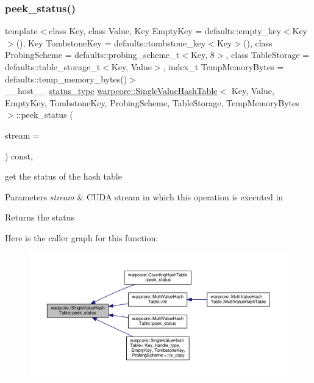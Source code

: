 \subsubsection{\texorpdfstring{peek\+\_\+status()}{peek\_status()}}
{\footnotesize\ttfamily template$<$class Key, class Value, Key Empty\+Key = defaults\+::empty\+\_\+key$<$\+Key$>$(), Key Tombstone\+Key = defaults\+::tombstone\+\_\+key$<$\+Key$>$(), class Probing\+Scheme = defaults\+::probing\+\_\+scheme\+\_\+t$<$\+Key, 8$>$, class Table\+Storage = defaults\+::table\+\_\+storage\+\_\+t$<$\+Key, Value$>$, index\+\_\+t Temp\+Memory\+Bytes = defaults\+::temp\+\_\+memory\+\_\+bytes()$>$ \\
\+\_\+\+\_\+host\+\_\+\+\_\+ \hyperlink{classwarpcore_1_1Status}{status\+\_\+type} \hyperlink{classwarpcore_1_1SingleValueHashTable}{warpcore\+::\+Single\+Value\+Hash\+Table}$<$ Key, Value, Empty\+Key, Tombstone\+Key, Probing\+Scheme, Table\+Storage, Temp\+Memory\+Bytes $>$\+::peek\+\_\+status (\begin{DoxyParamCaption}\item[{cuda\+Stream\+\_\+t}]{stream = {} }\end{DoxyParamCaption}) const\hspace{0.3cm}{\ttfamily [inline]}, {\ttfamily [noexcept]}}



get the status of the hash table 


\begin{DoxyParams}{Parameters}
{\em stream} & C\+U\+DA stream in which this operation is executed in \\
\hline
\end{DoxyParams}
\begin{DoxyReturn}{Returns}
the status 
\end{DoxyReturn}
Here is the caller graph for this function\+:
\nopagebreak
\begin{figure}[H]
\begin{center}
\leavevmode
\includegraphics[width=350pt]{classwarpcore_1_1SingleValueHashTable_a0d202448fc1427da9d4a745ec28b5976_icgraph}
\end{center}
\end{figure}
\mbox{\label{classwarpcore_1_1SingleValueHashTable_ad69a615811e4116c99b15648e9259bf7}} 
